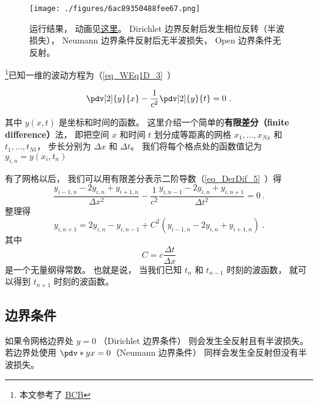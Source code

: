 

\begin{figure}[ht]
\centering
\texttt{[image: ./figures/6ac89350488fee67.png]}
\caption{运行结果， 动画见\href{https://wuli.wiki/apps/wavBC.html}{这里}。 Dirichlet 边界反射后发生相位反转（半波损失）， Neumann 边界条件反射后无半波损失， Open 边界条件无反射。} \label{fig_W1dNum_1}
\end{figure}

\footnote{本文参考了 \href{http://hplgit.github.io/num-methods-for-PDEs/doc/pub/wave/sphinx/._main_wave001.html\#discretizing-the-domain}{BCB}}已知一维的波动方程为（\autoref{eq_WEq1D_3}~）

\begin{equation}
\pdv[2]{y}{x} - \frac{1}{c^2}\pdv[2]{y}{t} = 0~.
\end{equation}

其中 $y(x, t)$ 是坐标和时间的函数。 这里介绍一个简单的\textbf{有限差分（finite difference）}法， 即把空间 $x$ 和时间 $t$ 划分成等距离的网格 $x_1, \dots, x_{Nx}$ 和 $t_1, \dots, t_{Nt}$， 步长分别为 $\Delta x$ 和 $\Delta t$。 我们将每个格点处的函数值记为 $y_{i,n} = y(x_i, t_n)$

有了网格以后， 我们可以用有限差分表示二阶导数（\autoref{eq_DerDif_5}~）得
\begin{equation}
\frac{y_{i-1,n} - 2y_{i,n} + y_{i+1,n}}{\Delta x^2} - \frac{1}{c^2} \frac{y_{i, n-1} - 2y_{i, n} + y_{i, n+1}}{\Delta t^2} = 0~.
\end{equation}
整理得
\begin{equation}
y_{i, n+1} = 2y_{i, n} - y_{i, n-1} + C^2(y_{i-1,n} - 2y_{i,n} + y_{i+1,n})~.
\end{equation}
其中
\begin{equation}
C = c \frac{\Delta t}{\Delta x}
\end{equation}
是一个无量纲得常数。 也就是说， 当我们已知 $t_n$ 和 $t_{n-1}$ 时刻的波函数， 就可以得到 $t_{n+1}$ 时刻的波函数。

\subsection{边界条件}
如果令网格边界处 $y = 0$ （Dirichlet 边界条件） 则会发生全反射且有半波损失。 若边界处使用 $\pdv*{y}{x} = 0$（Neumann 边界条件） 同样会发生全反射但没有半波损失。

